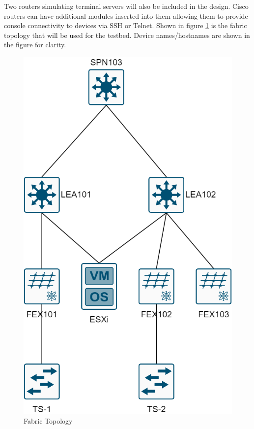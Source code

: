 Two routers simulating
terminal servers will also be included in the design. Cisco routers can have
additional modules inserted into them allowing them to provide console
connectivity to devices via SSH or Telnet.
Shown in figure
\ref{fig:fabric-topology} is the fabric topology that will be used for the
testbed. Device names/hostnames are shown in the figure for clarity.

\begin{figure}[H]
    \centering

    \includegraphics[scale=0.3]{images/aci-topology.png}
    \caption{Fabric
        Topology}
    \label{fig:fabric-topology}
\end{figure}


